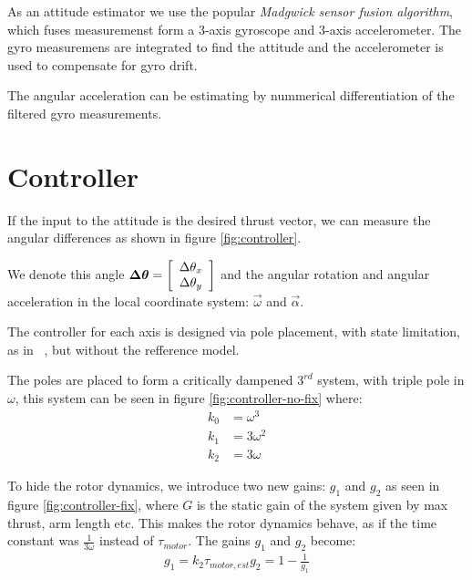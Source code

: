As an attitude estimator we use the popular \emph{Madgwick sensor fusion
algorithm}\cite{Madgwick2011}, which
fuses measuremenst form a 3-axis gyroscope and 3-axis accelerometer. The gyro measuremens are integrated to find the attitude and the
accelerometer is used to compensate for gyro drift.

The angular acceleration can be estimating by nummerical differentiation of the
filtered gyro measurements.

\section{ Controller } %

If the input to the attitude is the desired thrust vector, we can measure the
angular differences as shown in figure \ref{fig:controller}.

We denote this angle $\vec{\Delta\theta} = \matrix{c}{}{}{ \Delta \theta_x \\
\Delta\theta_y}$ and the angular rotation and angular acceleration
in the local coordinate system: $\vec\omega$ and $\vec\alpha$.


The controller for each axis is designed via pole placement, with state
limitation, as in~\cite{WangWang} 
, but without the refference model.

The poles are placed to form a critically dampened $3^{rd}$ system, with triple
pole in $\omega$, this system can be seen in figure \ref{fig:controller-no-fix}
where:
\begin{align}
k_0 & = \omega^3\\
k_1 & = 3\omega^2\\
k_2 & = 3\omega
\end{align}


To hide the rotor dynamics, we introduce two new gains: $g_1$ and $g_2$ as seen
in figure \ref{fig:controller-fix}, where $G$ is the static gain of the system
given by max thrust, arm length etc.
This makes the rotor dynamics behave, as if the time constant was $\frac{1}{3\omega}$ instead of $\tau_{motor}$.
The gains $g_1$ and $g_2$ become:
\begin{align}
g_1 = k_2 \tau_{motor,est}
g_2 =1 - \frac{1}{g_1}
\end{align}

